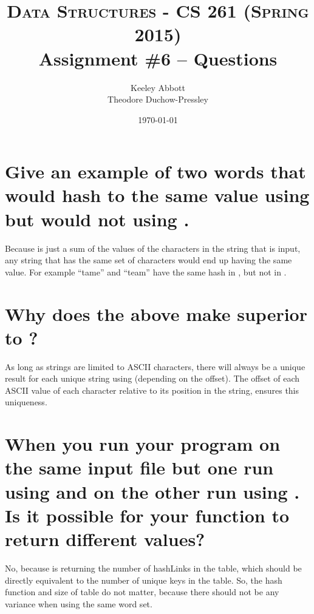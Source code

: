 \documentclass[letter,11pt]{scrartcl}
\title{
  \normalfont \normalsize
  \textsc{Data Structures - CS 261 (Spring 2015)} \\
  \huge Assignment \#6 -- Questions
}
\author{Keeley Abbott
\\ Theodore Duchow-Pressley}
\date{\normalsize\today}
\begin{document}
\maketitle


\section{Give an example of two words that would hash to the same value using
   but would not using .}

Because  is just a sum of the values of the characters in
the string that is input, any string that has the same set of characters would
end up having the same value. For example ``tame'' and ``team'' have the same
hash in , but not in .


\section{Why does the above make  superior to
  ?}

As long as strings are limited to ASCII characters, there will always be a
unique result for each unique string using  (depending on
the offset). The offset of each ASCII value of each character relative to its
position in the string, ensures this uniqueness.


\section{When you run your program on the same input file but one run using
   and on the other run using . Is it
  possible for your  function to return different values?}

No, because  is returning the number of hashLinks in the table,
which should be directly equivalent to the number of unique keys in the
table. So, the hash function and size of table do not matter, because there
should not be any variance when using the same word set.
\end{document}
